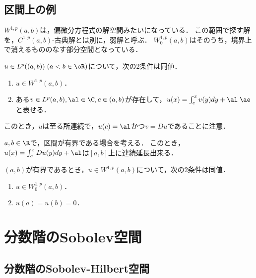 \documentclass[uplatex,dvipdfmx]{jsreport}
\begin{document}
\subsection{区間上の例}

\begin{tcolorbox}[colframe=ForestGreen, colback=ForestGreen!10!white,breakable,colbacktitle=ForestGreen!40!white,coltitle=black,fonttitle=\bfseries\sffamily,
title=]
    $W^{1,p}(a,b)$は，偏微分方程式の解空間みたいになっている．
    この範囲で探す解を，$C^{1,p}(a,b)$-古典解とは別に，弱解と呼ぶ．
    $W^{1,p}_0(a,b)$はそのうち，境界上で消えるもののなす部分空間となっている．
\end{tcolorbox}

\begin{theorem}
    $u\in L^p((a,b))\;(a<b\in\oR)$について，次の2条件は同値．
    \begin{enumerate}
        \item $u\in W^{1,p}(a,b)$．
        \item ある$v\in L^p(a,b),\al\in\C,c\in(a,b)$が存在して，$u(x)=\int^x_cv(y)dy+\al\;\ae$と表せる．
    \end{enumerate}
    このとき，$u$は至る所連続で，$u(c)=\al$かつ$v=Du$であることに注意．
\end{theorem}

\begin{definition}
    $a,b\in\R$で，区間が有界である場合を考える．
    このとき，$u(x)=\int^x_cDu(y)dy+\al$は$[a,b]$上に連続延長出来る．
\end{definition}

\begin{theorem}
    $(a,b)$が有界であるとき，$u\in W^{1,p}(a,b)$について，次の2条件は同値．
    \begin{enumerate}
        \item $u\in W^{1,p}_0(a,b)$．
        \item $u(a)=u(b)=0$．
    \end{enumerate}
\end{theorem}

\section{分数階のSobolev空間}

\subsection{分数階のSobolev-Hilbert空間}
\end{document}
